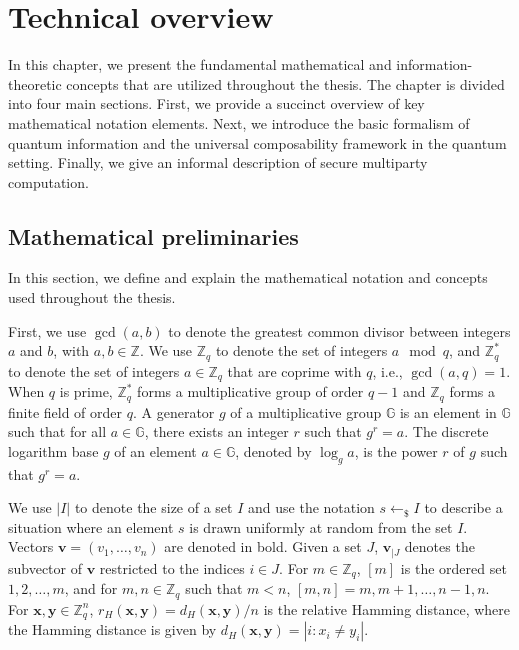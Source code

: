 


%

\chapter{Technical overview}

In this chapter, we present the fundamental mathematical and information-theoretic concepts that are utilized throughout the thesis. The chapter is divided into four main sections. First, we provide a succinct overview of key mathematical notation elements. Next, we introduce the basic formalism of quantum information and the universal composability framework in the quantum setting. Finally, we give an informal description of secure multiparty computation.

\section{Mathematical preliminaries}

In this section, we define and explain the mathematical notation and concepts used throughout the thesis.

First, we use $\gcd(a,b)$ to denote the greatest common divisor between integers $a$ and $b$, with $a,b \in \mathbb{Z}$. We use $\mathbb{Z}_q$ to denote the set of integers $a \mod q$, and $\mathbb{Z}^*_q$ to denote the set of integers $a \in \mathbb{Z}_q$ that are coprime with $q$, i.e., $\gcd(a,q) = 1$. When $q$ is prime, $\mathbb{Z}^*_q$ forms a multiplicative group of order $q-1$ and $\mathbb{Z}_q$ forms a finite field of order $q$. A generator $g$ of a multiplicative group $\mathbb{G}$ is an element in $\mathbb{G}$ such that for all $a \in \mathbb{G}$, there exists an integer $r$ such that $g^r = a$. The discrete logarithm base $g$ of an element $a \in \mathbb{G}$, denoted by $\log_g a$, is the power $r$ of $g$ such that $g^r = a$.

We use $|I|$ to denote the size of a set $I$ and use the notation  $s\leftarrow_{\$}I$ to describe a situation where an element $s$ is drawn uniformly at random from the set $I$. Vectors $\bm{v} = (v_1, \ldots, v_n)$ are denoted in bold. Given a set $J$, $\bm{v}_{|J}$ denotes the subvector of $\bm{v}$ restricted to the indices $i \in J$. For $m \in \mathbb{Z}_q$, $[m]$ is the ordered set ${1, 2, \ldots, m}$, and for $m, n \in \mathbb{Z}_q$ such that $m < n$, $[m, n] = {m, m+1, \ldots, n-1, n}$. For $\bm{x}, \bm{y} \in \mathbb{Z}^n_q$, $r_H(\bm{x}, \bm{y}) = d_H(\bm{x}, \bm{y})/n$ is the relative Hamming distance, where the Hamming distance is given by $d_H(\bm{x}, \bm{y}) = |{i : x_i \neq y_i}|$.

